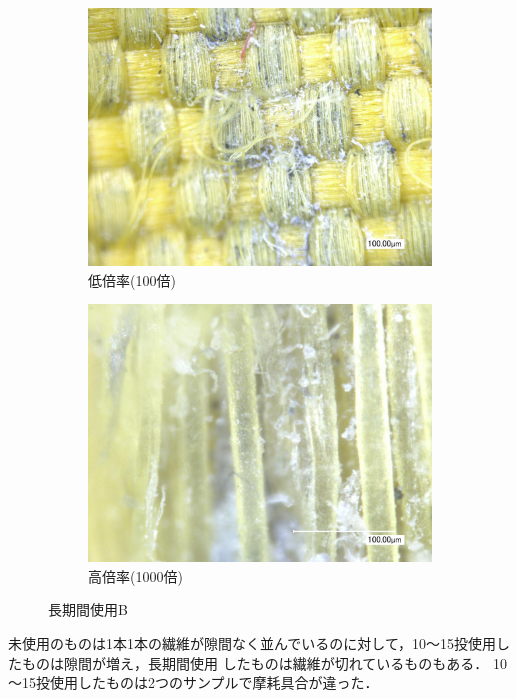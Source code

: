 \documentclass[main]{subfiles}
\begin{document}
\begin{figure}[H]
    \centering
    \begin{subfigure}[htbp]{0.45\linewidth}
        \centering
        \includegraphics[keepaspectratio, width=0.8\linewidth]{figures/縁/カーリングパッド長期低倍率B.jpg}
        \caption{低倍率(100倍)}
        \label{fig:label}
    \end{subfigure}
    \begin{subfigure}[htbp]{0.45\linewidth}
        \centering
        \includegraphics[keepaspectratio, width=0.8\linewidth]{figures/縁/カーリングパッド長期B.jpg}
        \caption{高倍率(1000倍)}
        \label{fig:label}
    \end{subfigure}
    \caption{長期間使用B}
    \label{fig:label}
\end{figure}


未使用のものは1本1本の繊維が隙間なく並んでいるのに対して，10～15投使用したものは隙間が増え，長期間使用
したものは繊維が切れているものもある．
10～15投使用したものは2つのサンプルで摩耗具合が違った．
\end{document}
